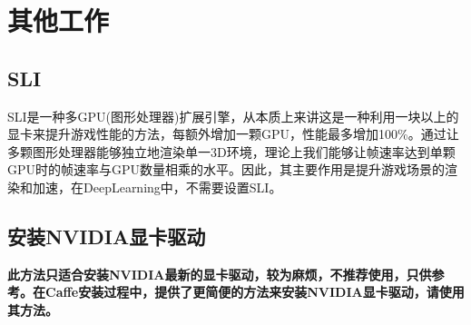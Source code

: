 \section{其他工作}
\subsection{SLI}
SLI是一种多GPU(图形处理器)扩展引擎，从本质上来讲这是一种利用一块以上的显卡来提升游戏性能的方法，每额外增加一颗GPU，性能最多增加100\%。通过让多颗图形处理器能够独立地渲染单一3D环境，理论上我们能够让帧速率达到单颗GPU时的帧速率与GPU数量相乘的水平。因此，其主要作用是提升游戏场景的渲染和加速，在DeepLearning中，不需要设置SLI。


\subsection{安装NVIDIA显卡驱动}
\textbf{此方法只适合安装NVIDIA最新的显卡驱动，较为麻烦，不推荐使用，只供参考。在Caffe安装过程中，提供了更简便的方法来安装NVIDIA显卡驱动，请使用其方法。}
